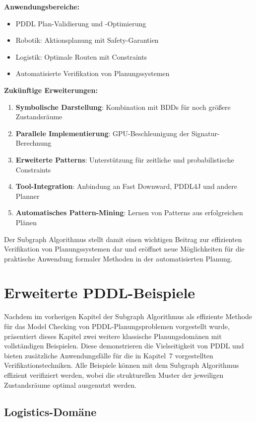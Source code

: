 ﻿\documentclass[a4paper,12pt]{article}
\theoremstyle{definition}
\begin{document}
\textbf{Anwendungsbereiche:}
\begin{itemize}
	\item[-] PDDL Plan-Validierung und -Optimierung
	\item[-] Robotik: Aktionsplanung mit Safety-Garantien
	\item[-] Logistik: Optimale Routen mit Constraints
	\item[-] Automatisierte Verifikation von Planungssystemen
\end{itemize}

\textbf{Zukünftige Erweiterungen:}
\begin{enumerate}
	\item \textbf{Symbolische Darstellung}: Kombination mit BDDs für noch größere Zustandsräume
	\item \textbf{Parallele Implementierung}: GPU-Beschleunigung der Signatur-Berechnung
	\item \textbf{Erweiterte Patterns}: Unterstützung für zeitliche und probabilistische Constraints
	\item \textbf{Tool-Integration}: Anbindung an Fast Downward, PDDL4J und andere Planner
	\item \textbf{Automatisches Pattern-Mining}: Lernen von Patterns aus erfolgreichen Plänen
\end{enumerate}

Der Subgraph Algorithmus stellt damit einen wichtigen Beitrag zur effizienten Verifikation von Planungssystemen dar und eröffnet neue Möglichkeiten für die praktische Anwendung formaler Methoden in der automatisierten Planung.

\section{Erweiterte PDDL-Beispiele}

Nachdem im vorherigen Kapitel der Subgraph Algorithmus als effiziente Methode für das Model Checking von PDDL-Planungsproblemen vorgestellt wurde, präsentiert dieses Kapitel zwei weitere klassische Planungsdomänen mit vollständigen Beispielen. Diese demonstrieren die Vielseitigkeit von PDDL und bieten zusätzliche Anwendungsfälle für die in Kapitel~7 vorgestellten Verifikationstechniken. Alle Beispiele können mit dem Subgraph Algorithmus effizient verifiziert werden, wobei die strukturellen Muster der jeweiligen Zustandsräume optimal ausgenutzt werden.

\subsection{Logistics-Domäne}
\end{document}
